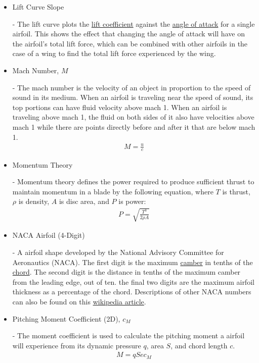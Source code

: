 \documentclass{article}
\begin{document}
\begin{itemize}
	\item \hypertarget{LC}{Lift Curve Slope} - The lift curve plots the \hyperlink{CL}{lift coefficient} against the \hyperlink{alpha}{angle of attack} for a single airfoil. This shows the effect that changing the angle of attack will have on the airfoil's total lift force, which can be combined with other airfoils in the case of a wing to find the total lift force experienced by the wing.
		
	\item \hypertarget{M}{Mach Number, $M$} - The mach number is the velocity of an object in proportion to the speed of sound in its medium. When an airfoil is traveling near the speed of sound, its top portions can have fluid velocity above mach 1. When an airfoil is traveling above mach 1, the fluid on both sides of it also have velocities above mach 1 while there are points directly before and after it that are below mach 1.
		\begin{equation} \label{eq:15}
		\begin{aligned}
        			M = \frac{u}{c}
	    	\end{aligned}
		\end{equation}
	
	\item \hypertarget{MT}{Momentum Theory} - Momentum theory defines the power required to produce sufficient thrust to maintain momentum in a blade by the following equation, where $T$ is thrust, $\rho$ is density, $A$ is disc area, and $P$ is power:
	\begin{equation}
	\begin{aligned}
        		P = \sqrt{\frac{T^{3}}{2 \rho A}}
	\end{aligned}
	\end{equation}
		
	\item \hypertarget{NACA}{NACA Airfoil (4-Digit)} - A airfoil shape developed by the National Advisory Committee for Aeronautics (NACA). The first digit is the maximum \hyperlink{Camber}{camber} in tenths of the \hyperlink{c}{chord}. The second digit is the distance in tenths of the maximum camber from the leading edge, out of ten. the final two digits are the maximum airfoil thickness as a percentage of the chord. Descriptions of other NACA numbers can also be found on this \href{https://en.wikipedia.org/wiki/NACA_airfoil}{wikipedia article}. 
		
	\item \hypertarget{CM}{Pitching Moment Coefficient (2D), $c_{M}$} - The moment coefficient is used to calculate the pitching moment a airfoil will experience from its dynamic pressure $q$, area $S$, and chord length $c$.
		\begin{equation} \label{eq:16}
		\begin{aligned}
        			M = q S e c_{M}
	    	\end{aligned}
		\end{equation}


\end{itemize}
\end{document}
